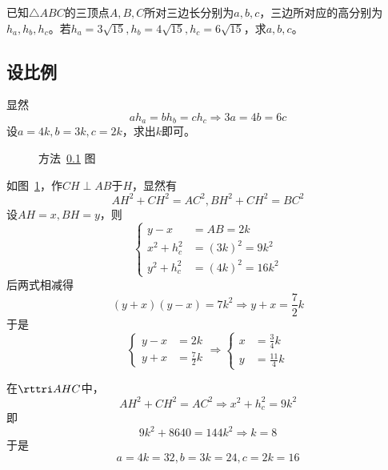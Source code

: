 

已知$\triangle ABC$的三顶点$A, B, C$所对三边长分别为$a, b, c$，三边所对应的高分别为$h_a, h_b, h_c$。若$h_a = 3\sqrt{15}, h_b = 4\sqrt{15}, h_c = 6\sqrt{15}$，求$a, b, c$。


\subsection{设比例} \label{subsec:0058-rt}

显然
\[ ah_a = bh_b = ch_c \Rightarrow 3a = 4b = 6c \]
设$a = 4k, b = 3k, c = 2k$，求出$k$即可。

\begin{figure}[htbp]
  \centering {}
  \caption{方法~\ref{subsec:0058-rt} 图} \label{fig:0058-rt}
\end{figure}

如图~\ref{fig:0058-rt}，作$CH \perp AB$于$H$，显然有
\[ AH^2 + CH^2 = AC^2, BH^2 + CH^2 = BC^2 \]
设$AH = x, BH = y$，则
\[ \left\{ \begin{aligned}
  y - x &= AB = 2k \\
  x^2 + h_c^2 &= (3k)^2 = 9k^2 \\
  y^2 + h_c^2 &= (4k)^2 = 16k^2
\end{aligned} \right. \]
后两式相减得
\[ (y + x)(y - x) = 7k^2 \Rightarrow y + x = \frac72k \]
于是
\[ \left\{ \begin{aligned}
  y - x &= 2k \\
  y + x &= \frac72k
\end{aligned} \right.
\Rightarrow \left\{ \begin{aligned}
  x &= \frac34k \\
  y &= \frac{11}4k
\end{aligned} \right. \]

在$\rttri AHC$中，
\[ AH^2 + CH^2 = AC^2 \Rightarrow x^2 + h_c^2 = 9k^2 \]
即
\[ 9k^2 + 8640 = 144k^2 \Rightarrow k = 8 \]
于是
\[ a = 4k = 32, b = 3k = 24, c = 2k = 16 \]
